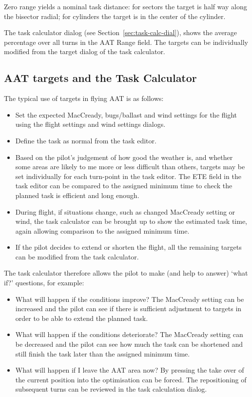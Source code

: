 Zero range yields a nominal task distance: for sectors the target is
half way along the bisector radial; for cylinders the target is in the
center of the cylinder.

The task calculator dialog (see Section~\ref{sec:task-calc-dial}), shows the
average percentage over all turns in the AAT Range field.
The targets can be individually modified from the target dialog of the task
calculator.


\subsection*{AAT targets and the Task Calculator}

The typical use of targets in flying AAT is as follows:
\begin{itemize}
\item Set the expected MacCready, bugs/ballast and wind settings
  for the flight using the flight settings and wind settings dialogs.
\item Define the task as normal from the task editor.
\item Based on the pilot's judgement of how good the weather is,
  and whether some areas are likely to me more or less difficult than
  others, targets may be set individually for each turn-point in the
  task editor.  The ETE field in the task editor can be compared to
  the assigned minimum time to check the planned task is efficient and
  long enough.
\item During flight, if situations change, such as changed MacCready setting
  or wind, the task calculator can be brought up to show the estimated
  task time, again allowing comparison to the assigned minimum time.
\item If the pilot decides to extend or shorten the flight, all the remaining
  targets can be modified from the task calculator. 
\end{itemize}

The task calculator therefore allows the pilot to make (and help to
answer) `what if?' questions, for example:
\begin{itemize}
\item What will happen if the conditions improve?  The MacCready setting can be 
increased and the pilot can see if there is sufficient adjustment to targets in 
order to be able to extend the planned task.
\item What will happen if the conditions deteriorate?  The MacCready setting can 
be decreased and the pilot can see how much the task can be shortened and still 
finish the task later than the assigned minimum time.
\item What will happen if I leave the AAT area now?  By pressing  the take over of the current position into the optimisation can
be forced. The repositioning of subsequent turns can be reviewed in the task calculation
dialog.
\end{itemize}

